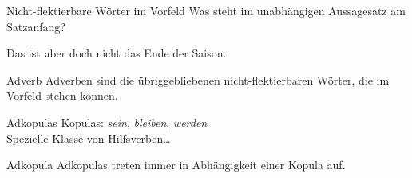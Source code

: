 \begin{frame}
  {Nicht-flektierbare Wörter im Vorfeld}
  \pause
  Was steht im unabhängigen Aussagesatz am Satzanfang?\\
  \pause
  {}
  \pause
  \begin{exe}
    \ex\label{ex:adverbenadkopulasundpartikeln038}
    \begin{xlist}
      \pause
      \pause
      \pause
      \pause
      \pause
      \pause
      \pause
      \pause
      \pause
      \pause
    \end{xlist}
    \ex\label{ex:adverbenadkopulasundpartikeln044} Das ist aber \alert{doch} nicht das Ende der Saison.
  \end{exe}
  \pause
  \Viertelzeile
  \begin{block}{Adverb}
    Adverben sind die übriggebliebenen nicht-flektierbaren Wörter, die im Vorfeld stehen können.
  \end{block}
\end{frame}

\begin{frame}
  {Adkopulas}
  \pause
  Kopulas: \textit{sein}, \textit{bleiben}, \textit{werden}\\
  \pause
  Spezielle Klasse von Hilfsverben\dots
  \pause
  \Zeile
  \begin{exe}
    \ex
    \begin{xlist}
      \pause
      \pause
      \pause
      \pause
      \pause
      \pause
    \end{xlist}
    \Zeile
    \ex
    \begin{xlist}
      \pause
      \pause
      \pause
      \pause
      \pause
      \pause
    \end{xlist}
    \Zeile
    \ex
    \begin{xlist}
      \pause
      \pause
      \pause
      \pause
      \pause
      \pause
    \end{xlist}
  \end{exe}
  \begin{block}{Adkopula}
    Adkopulas treten immer in Abhängigkeit einer Kopula auf.
  \end{block}
\end{frame}

